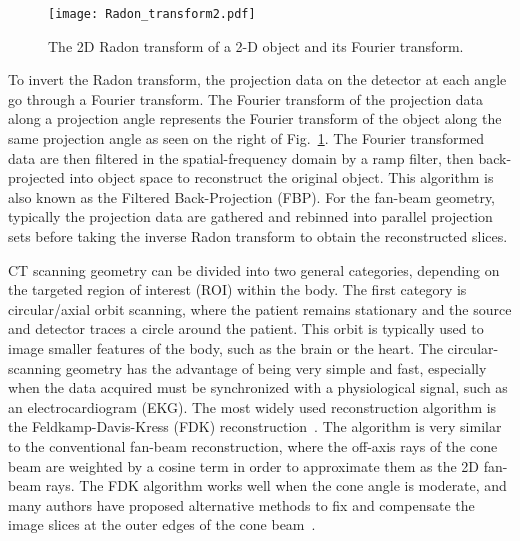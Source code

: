 \begin{figure}[h]
\centering
\texttt{[image: Radon\_transform2.pdf]}
\caption{The 2D Radon transform of a 2-D object and its Fourier transform.}
\label{fig:RadonTransform}
\end{figure}
%
To invert the Radon transform, the projection data on the detector at each angle go through a Fourier transform.  The Fourier transform of the projection data along a projection angle represents the Fourier transform of the object along the same projection angle as seen on the right of Fig.~\ref{fig:RadonTransform}.  The Fourier transformed data are then filtered in the spatial-frequency domain by a ramp filter, then back-projected into object space to reconstruct the original object.  This algorithm is also known as the Filtered Back-Projection (FBP).  For the fan-beam geometry, typically the projection data are gathered and rebinned into parallel projection sets before taking the inverse Radon transform to obtain the reconstructed slices.

CT scanning geometry can be divided into two general categories, depending on the targeted region of interest (ROI) within the body.  The first category is circular/axial orbit scanning, where the patient remains stationary and the source and detector traces a circle around the patient.  This orbit is typically used to image smaller features of the body, such as the brain or the heart.  The circular-scanning geometry has the advantage of being very simple and fast, especially when the data acquired must be synchronized with a physiological signal, such as an electrocardiogram (EKG).  The most widely used reconstruction algorithm is the Feldkamp-Davis-Kress (FDK) reconstruction~\citep{Feldkamp1984}.  The algorithm is very similar to the conventional fan-beam reconstruction, where the off-axis rays of the cone beam are weighted by a cosine term in order to approximate them as the 2D fan-beam rays.  The FDK algorithm works well when the cone angle is moderate, and many authors have proposed alternative methods to fix and compensate the image slices at the outer edges of the cone beam~\citep{Katsevich2003, Chen2003, Hu1996}.

